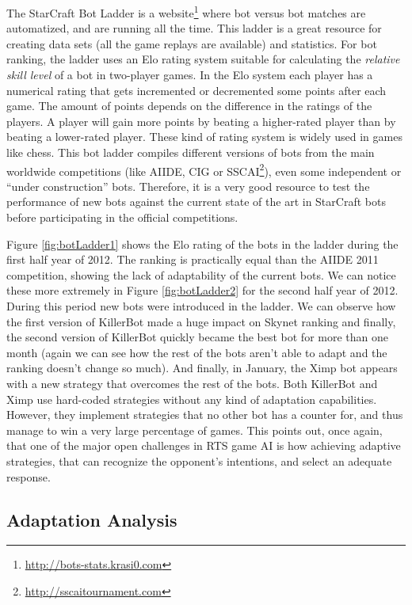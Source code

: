 \documentclass[journal]{IEEEtran}
\begin{document}
The StarCraft Bot Ladder is a website\footnote{\url{http://bots-stats.krasi0.com}} where bot versus bot matches are automatized, and are running all the time. This ladder is a great resource for creating data sets (all the game replays are available) and statistics. For bot ranking, the ladder uses an Elo rating system suitable for calculating the \emph{relative skill level} of a bot in two-player games. In the Elo system each player has a numerical rating that gets incremented or decremented some points after each game. The amount of points depends on the difference in the ratings of the players. A player will gain more points by beating a higher-rated player than by beating a lower-rated player. These kind of rating system is widely used in games like chess. This bot ladder compiles different versions of bots from the main worldwide competitions (like AIIDE, CIG or SSCAI\footnote{\url{http://sscaitournament.com}}), even some independent or ``under construction'' bots. Therefore, it is a very good resource to test the performance of new bots against the current state of the art in StarCraft bots before participating in the official competitions.

Figure \ref{fig:botLadder1} shows the Elo rating of the bots in the ladder during the first half year of 2012. The ranking is practically equal than the AIIDE 2011 competition, showing the lack of adaptability of the current bots. We can notice these more extremely in Figure \ref{fig:botLadder2} for the second half year of 2012. During this period new bots were introduced in the ladder. We can observe how the first version of KillerBot made a huge impact on Skynet ranking and finally, the second version of KillerBot quickly became the best bot for more than one month (again we can see how the rest of the bots aren't able to adapt and the ranking doesn't change so much). And finally, in January, the Ximp bot appears with a new strategy that overcomes the rest of the bots. Both KillerBot and Ximp use hard-coded strategies without any kind of adaptation capabilities. However, they implement strategies that no other bot has a counter for, and thus manage to win a very large percentage of games. This points out, once again, that one of the major open challenges in RTS game AI is how achieving adaptive strategies, that can recognize the opponent's intentions, and select an adequate response.


\subsection{Adaptation Analysis}
\end{document}
